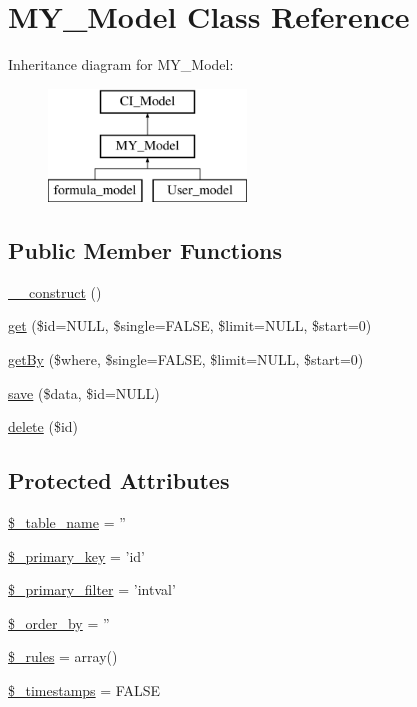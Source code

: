 \hypertarget{class_m_y___model}{\section{M\-Y\-\_\-\-Model Class Reference}
\label{class_m_y___model}
}
Inheritance diagram for M\-Y\-\_\-\-Model\-:\begin{figure}[H]
\begin{center}
\leavevmode
\includegraphics[height=3.000000cm]{class_m_y___model}
\end{center}
\end{figure}
\subsection*{Public Member Functions}
\begin{DoxyCompactItemize}
\item 
\hyperlink{class_m_y___model_a095c5d389db211932136b53f25f39685}{\-\_\-\-\_\-construct} ()
\item 
\hyperlink{class_m_y___model_abbfccf1ac0e1d38054ab56a781f63713}{get} (\$id=N\-U\-L\-L, \$single=F\-A\-L\-S\-E, \$limit=N\-U\-L\-L, \$start=0)
\item 
\hyperlink{class_m_y___model_a48d0ed63c78ef8d7c3f6bfc890fda8de}{get\-By} (\$where, \$single=F\-A\-L\-S\-E, \$limit=N\-U\-L\-L, \$start=0)
\item 
\hyperlink{class_m_y___model_ab8deb57144bc4a1fe191f85b26805460}{save} (\$data, \$id=N\-U\-L\-L)
\item 
\hyperlink{class_m_y___model_a2f8258add505482d7f00ea26493a5723}{delete} (\$id)
\end{DoxyCompactItemize}
\subsection*{Protected Attributes}
\begin{DoxyCompactItemize}
\item 
\hyperlink{class_m_y___model_a90ebc25e748e2696e00b5c5cf3255ee4}{\$\-\_\-table\-\_\-name} = ''
\item 
\hyperlink{class_m_y___model_a1befeb0c72587cd2574cd7d1818d66b8}{\$\-\_\-primary\-\_\-key} = 'id'
\item 
\hyperlink{class_m_y___model_a46d38cf0c97ee3e0a37dee799457bd14}{\$\-\_\-primary\-\_\-filter} = 'intval'
\item 
\hyperlink{class_m_y___model_a66602db6a52856d08dbd0f2eb34be787}{\$\-\_\-order\-\_\-by} = ''
\item 
\hyperlink{class_m_y___model_a2432b65e7e8b8a8328a1c47ab6ca0409}{\$\-\_\-rules} = array()
\item 
\hyperlink{class_m_y___model_aa701f5b72d73b3c5a7516cd6221c60cc}{\$\-\_\-timestamps} = F\-A\-L\-S\-E
\end{DoxyCompactItemize}


